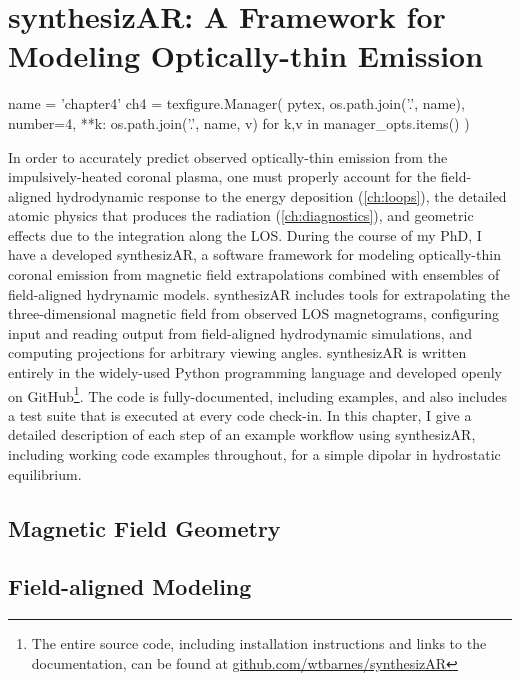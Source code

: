 \chapter{synthesizAR: A Framework for Modeling Optically-thin Emission}

\begin{pycode}[chapter4]
name = 'chapter4'
ch4 = texfigure.Manager(
    pytex,
    os.path.join('.', name),
    number=4,
    **{k: os.path.join('.', name, v) for k,v in manager_opts.items()}
)
\end{pycode}

In order to accurately predict observed optically-thin emission from the impulsively-heated coronal plasma, one must properly account for the field-aligned hydrodynamic response to the energy deposition (\autoref{ch:loops}), the detailed atomic physics that produces the radiation (\autoref{ch:diagnostics}), and geometric effects due to the integration along the LOS. During the course of my PhD, I have a developed synthesizAR, a software framework for modeling optically-thin coronal emission from magnetic field extrapolations combined with ensembles of field-aligned hydrynamic models. synthesizAR includes tools for extrapolating the three-dimensional magnetic field from observed LOS magnetograms, configuring input and reading output from field-aligned hydrodynamic simulations, and computing projections for arbitrary viewing angles. synthesizAR is written entirely in the widely-used Python programming language and developed openly on GitHub\footnote{The entire source code, including installation instructions and links to the documentation, can be found at \href{https://github.com/wtbarnes/synthesizAR}{github.com/wtbarnes/synthesizAR}}. The code is fully-documented, including examples, and also includes a test suite that is executed at every code check-in. In this chapter, I give a detailed description of each step of an example workflow using synthesizAR, including working code examples throughout, for a simple dipolar \AR{} in hydrostatic equilibrium.

\section{Magnetic Field Geometry}


\section{Field-aligned Modeling}

